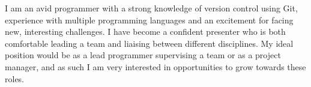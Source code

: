 

\begin{cvparagraph}
    I am an avid programmer with a strong knowledge of version control using Git, experience with multiple programming languages and an excitement for facing new, interesting challenges. I have become a confident presenter who is both comfortable leading a team and liaising between different disciplines. My ideal position would be as a lead programmer supervising a team or as a project manager, and as such I am very interested in opportunities to grow towards these roles.
\end{cvparagraph}
